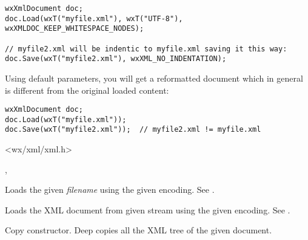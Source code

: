 \begin{verbatim}
wxXmlDocument doc;
doc.Load(wxT("myfile.xml"), wxT("UTF-8"), wxXMLDOC_KEEP_WHITESPACE_NODES);

// myfile2.xml will be indentic to myfile.xml saving it this way:
doc.Save(wxT("myfile2.xml"), wxXML_NO_INDENTATION);
\end{verbatim}

Using default parameters, you will get a reformatted document which in general is different from
the original loaded content:

\begin{verbatim}
wxXmlDocument doc;
doc.Load(wxT("myfile.xml"));
doc.Save(wxT("myfile2.xml"));  // myfile2.xml != myfile.xml
\end{verbatim}





<wx/xml/xml.h>


, 





\label{wxxmldocumentwxxmldocument}




Loads the given {\it filename} using the given encoding. See .


Loads the XML document from given stream using the given encoding. See .


Copy constructor. Deep copies all the XML tree of the given document.


\label{wxxmldocumentdtor}


